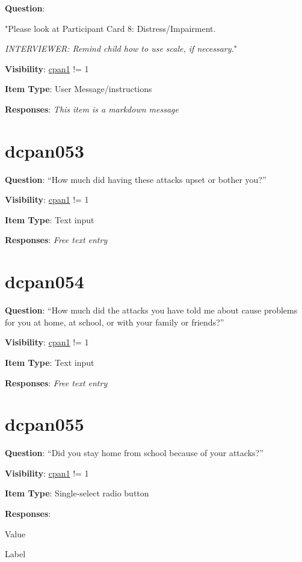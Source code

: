 \documentclass[]{book}
\begin{document}
\textbf{Question}:

"Please look at Participant Card 8: Distress/Impairment.

\emph{INTERVIEWER: Remind child how to use scale, if necessary.}"

\textbf{Visibility}: \protect\hyperlink{cpan1}{cpan1} != 1

\textbf{Item Type}: User Message/instructions

\textbf{Responses}: \emph{This item is a markdown message}

\hypertarget{dcpan053}{%
\section{dcpan053}\label{dcpan053}}

\textbf{Question}: ``How much did having these attacks upset or bother you?''

\textbf{Visibility}: \protect\hyperlink{cpan1}{cpan1} != 1

\textbf{Item Type}: Text input

\textbf{Responses}: \emph{Free text entry}

\hypertarget{dcpan054}{%
\section{dcpan054}\label{dcpan054}}

\textbf{Question}: ``How much did the attacks you have told me about cause problems for you at home, at school, or with your family or friends?''

\textbf{Visibility}: \protect\hyperlink{cpan1}{cpan1} != 1

\textbf{Item Type}: Text input

\textbf{Responses}: \emph{Free text entry}

\hypertarget{dcpan055}{%
\section{dcpan055}\label{dcpan055}}

\textbf{Question}: ``Did you stay home from school because of your attacks?''

\textbf{Visibility}: \protect\hyperlink{cpan1}{cpan1} != 1

\textbf{Item Type}: Single-select radio button

\textbf{Responses}:

Value

Label
\end{document}
